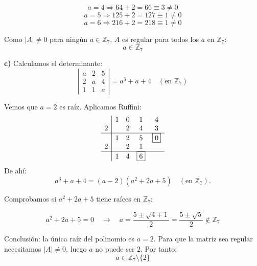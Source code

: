 \documentclass[a4paper,12pt]{article}
\begin{document}
\begin{ejercicio}[title=Ejercicio 16]
\[
a = 4 \Rightarrow 64 + 2 = 66 \equiv 3 \neq 0
\]
\[
a = 5 \Rightarrow 125 + 2 = 127 \equiv 1 \neq 0
\]
\[
a = 6 \Rightarrow 216 + 2 = 218 \equiv 1 \neq 0
\]

Como $|A| \neq 0$ para ningún $a \in \mathbb{Z}_7$, $A$ es regular para todos los $a$ en $\mathbb{Z}_7$:
\[
\boxed{a \in \mathbb{Z}_7}
\]

\vspace{0.5em}

\textbf{c)}
Calculamos el determinante:
\[
\left|
\begin{matrix}
a & 2 & 5\\
2 & a & 4\\
1 & 1 & a
\end{matrix}
\right|
= a^3 + a + 4 \quad (\text{en } \mathbb{Z}_7)
\]

Vemos que $a=2$ es raíz. Aplicamos Ruffini:
\[
\begin{array}{c|cccc}
  & 1 & 0 & 1 & 4 \\
2 &   & 2 & 4 & 3 \\
\hline
  & 1 & 2 & 5 & \boxed{0} \\
2 &  & 2 & 1 \\
\hline
  & 1 & 4 & \boxed{6} \\
\end{array}
\]
De ahí:
\[
a^3 + a + 4 = (a - 2)(a^2 + 2a + 5) \quad (\text{en } \mathbb{Z}_7).
\]

Comprobamos si \(a^2 + 2a + 5\) tiene raíces en \(\mathbb{Z}_7\):

\[
a^2+2a+5=0 \quad\rightarrow\quad a=\frac{5\pm\sqrt{4+1}}{2} = \frac{5\pm\sqrt{5}}{2} \notin \mathbb{Z}_7
\]

Conclusión: la única raíz del polinomio es \(a=2\). Para que la matriz sea regular necesitamos \( |A| \neq 0\), luego \(a\) no puede ser \(2\). Por tanto:
\[
\boxed{a \in \mathbb{Z}_7 \setminus \{2\}}
\]

\end{ejercicio}
\end{document}

